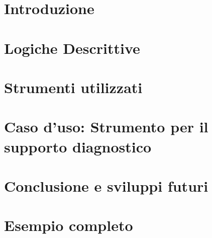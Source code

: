 \documentclass[12pt,twoside]{report}
\begin{document}
    
    
	
	
	\tableofcontents
	
	\chapter{Introduzione}
	
	
	\chapter{Logiche Descrittive}\label{chap: DL}
	
	
	\chapter{Strumenti utilizzati}
	
	
	\chapter{Caso d'uso: Strumento per il supporto diagnostico}
	
	
	\chapter{Conclusione e sviluppi futuri}
	
	
	\appendix
	\chapter{Esempio completo}
	
	
	\printbibliography
	
		
	
	
	
\end{document}
